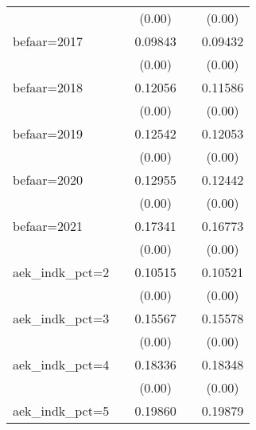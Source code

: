 \begin{table}[htbp]
\begin{tabular}{l*{4}{c}}
                    &                     &      (0.00)         &                     &      (0.00)         \\
befaar=2017         &                     &     0.09843\sym{***}&                     &     0.09432\sym{***}\\
                    &                     &      (0.00)         &                     &      (0.00)         \\
befaar=2018         &                     &     0.12056\sym{***}&                     &     0.11586\sym{***}\\
                    &                     &      (0.00)         &                     &      (0.00)         \\
befaar=2019         &                     &     0.12542\sym{***}&                     &     0.12053\sym{***}\\
                    &                     &      (0.00)         &                     &      (0.00)         \\
befaar=2020         &                     &     0.12955\sym{***}&                     &     0.12442\sym{***}\\
                    &                     &      (0.00)         &                     &      (0.00)         \\
befaar=2021         &                     &     0.17341\sym{***}&                     &     0.16773\sym{***}\\
                    &                     &      (0.00)         &                     &      (0.00)         \\
aek\_indk\_pct=2      &                     &     0.10515\sym{***}&                     &     0.10521\sym{***}\\
                    &                     &      (0.00)         &                     &      (0.00)         \\
aek\_indk\_pct=3      &                     &     0.15567\sym{***}&                     &     0.15578\sym{***}\\
                    &                     &      (0.00)         &                     &      (0.00)         \\
aek\_indk\_pct=4      &                     &     0.18336\sym{***}&                     &     0.18348\sym{***}\\
                    &                     &      (0.00)         &                     &      (0.00)         \\
aek\_indk\_pct=5      &                     &     0.19860\sym{***}&                     &     0.19879\sym{***}\\

\end{tabular}
\end{table}
